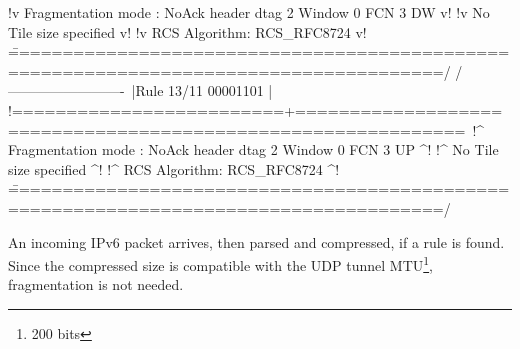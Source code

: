 \begin{termc}[backgroundcolor=\color{palerod}, basicstyle=\ttfamily\tiny]
!v Fragmentation mode : NoAck    header dtag 2 Window  0 FCN  3                     DW v!
!v No Tile size specified                                                              v!
!v RCS Algorithm: RCS_RFC8724                                                          v!
\=======================================================================================/
/-------------------------\
|Rule 13/11     00001101  |
!=========================+=============================================================\
!^ Fragmentation mode : NoAck    header dtag 2 Window  0 FCN  3                     UP ^!
!^ No Tile size specified                                                              ^!
!^ RCS Algorithm: RCS_RFC8724                                                          ^!
\=======================================================================================/
\end{termc}

An incoming IPv6 packet arrives, then parsed and compressed, if a rule is found. Since the compressed size is compatible with the UDP tunnel MTU\footnote{200 bits}, fragmentation is not needed.

